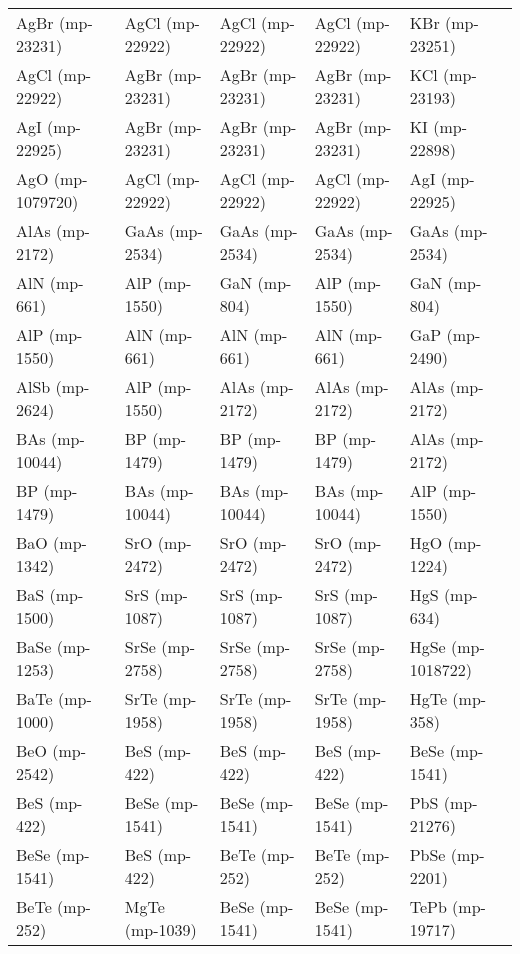 \begin{longtable}{lllll}
\bottomrule
\endlastfoot
  AgBr (mp-23231) &   AgCl (mp-22922) &     AgCl (mp-22922) &   AgCl (mp-22922) &      KBr (mp-23251) \\
  AgCl (mp-22922) &   AgBr (mp-23231) &     AgBr (mp-23231) &   AgBr (mp-23231) &      KCl (mp-23193) \\
   AgI (mp-22925) &   AgBr (mp-23231) &     AgBr (mp-23231) &   AgBr (mp-23231) &       KI (mp-22898) \\
 AgO (mp-1079720) &   AgCl (mp-22922) &     AgCl (mp-22922) &   AgCl (mp-22922) &      AgI (mp-22925) \\
   AlAs (mp-2172) &    GaAs (mp-2534) &      GaAs (mp-2534) &    GaAs (mp-2534) &      GaAs (mp-2534) \\
     AlN (mp-661) &     AlP (mp-1550) &        GaN (mp-804) &     AlP (mp-1550) &        GaN (mp-804) \\
    AlP (mp-1550) &      AlN (mp-661) &        AlN (mp-661) &      AlN (mp-661) &       GaP (mp-2490) \\
   AlSb (mp-2624) &     AlP (mp-1550) &      AlAs (mp-2172) &    AlAs (mp-2172) &      AlAs (mp-2172) \\
   BAs (mp-10044) &      BP (mp-1479) &        BP (mp-1479) &      BP (mp-1479) &      AlAs (mp-2172) \\
     BP (mp-1479) &    BAs (mp-10044) &      BAs (mp-10044) &    BAs (mp-10044) &       AlP (mp-1550) \\
    BaO (mp-1342) &     SrO (mp-2472) &       SrO (mp-2472) &     SrO (mp-2472) &       HgO (mp-1224) \\
    BaS (mp-1500) &     SrS (mp-1087) &       SrS (mp-1087) &     SrS (mp-1087) &        HgS (mp-634) \\
   BaSe (mp-1253) &    SrSe (mp-2758) &      SrSe (mp-2758) &    SrSe (mp-2758) &   HgSe (mp-1018722) \\
   BaTe (mp-1000) &    SrTe (mp-1958) &      SrTe (mp-1958) &    SrTe (mp-1958) &       HgTe (mp-358) \\
    BeO (mp-2542) &      BeS (mp-422) &        BeS (mp-422) &      BeS (mp-422) &      BeSe (mp-1541) \\
     BeS (mp-422) &    BeSe (mp-1541) &      BeSe (mp-1541) &    BeSe (mp-1541) &      PbS (mp-21276) \\
   BeSe (mp-1541) &      BeS (mp-422) &       BeTe (mp-252) &     BeTe (mp-252) &      PbSe (mp-2201) \\
    BeTe (mp-252) &    MgTe (mp-1039) &      BeSe (mp-1541) &    BeSe (mp-1541) &     TePb (mp-19717) \\

\end{longtable}
